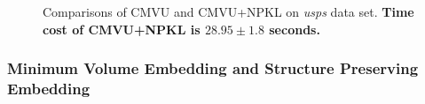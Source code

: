 \begin{figure}[!htbp]
\begin{center}
\caption{Comparisons of CMVU and CMVU+NPKL on {\em usps} data set. \textbf{Time cost of CMVU+NPKL is $28.95\pm1.8$ seconds.} } \label{fig:cmvu-usps}\vspace{-0.1in}
\end{center}
\end{figure}


\subsubsection{Minimum Volume Embedding and Structure Preserving Embedding}

